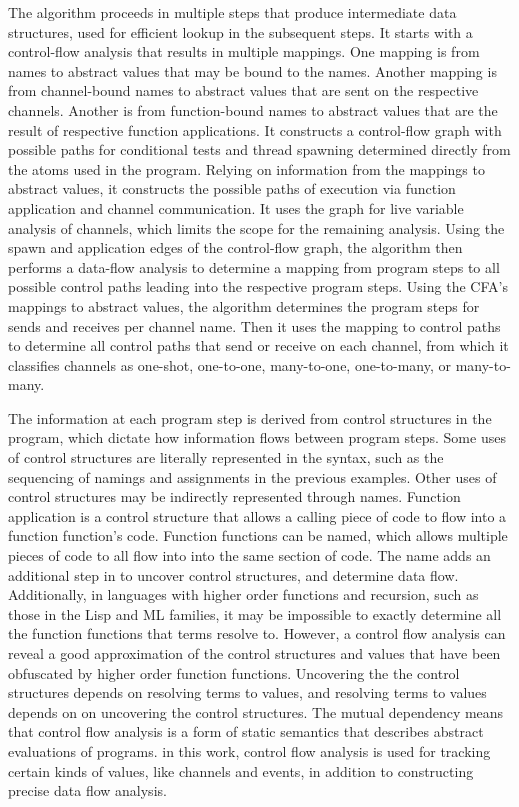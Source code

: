 \documentclass[10pt]{article}
\begin{document}
The algorithm proceeds in multiple steps that produce intermediate data structures, used for
efficient lookup in the subsequent steps.  It starts with a control-flow analysis that
results in multiple mappings. One mapping is from names to abstract values that may be bound to
the names. Another mapping is from channel-bound names to abstract values that are
sent on the respective channels. Another is from function-bound names to abstract values
that are the result of respective function applications.  It constructs a control-flow graph 
with possible paths for conditional tests and thread spawning determined directly from the
atoms used in the program.  Relying on information from the mappings to abstract values,
it constructs the possible paths of execution via function application and channel
communication.  It uses the graph for live variable analysis of channels, which limits the
scope for the remaining analysis.  Using the spawn and application edges of the control-flow
graph, the algorithm then performs a data-flow analysis to determine a mapping from program
steps to all possible control paths leading into the respective program steps.  Using the
CFA's mappings to abstract values, the algorithm determines the program steps for sends and
receives per channel name.  Then it uses the mapping to control paths to determine all
control paths that send or receive on each channel, from which it classifies channels as
one-shot, one-to-one, many-to-one, one-to-many, or many-to-many.

The information at each program step is derived from control structures in the program, which
dictate how information flows between program steps. Some uses of control structures are
literally represented in the syntax, such as the sequencing of namings and assignments in the
previous examples. Other uses of control structures may be indirectly represented through
names. Function application is a control structure that allows a calling piece of code to
flow into a function function's code.  Function functions can be named, which allows
multiple pieces of code to all flow into into the same section of code. The name adds an
additional step in to uncover control structures, and determine data flow.
Additionally, in languages with higher order functions and recursion, such as those in the Lisp
and ML families, it may be impossible to exactly determine all the function functions that
terms resolve to. However, a control flow analysis can reveal a good
approximation of the control structures and values that have been obfuscated by higher order
function functions.  Uncovering the the control structures depends on resolving terms
to values, and resolving terms to values depends on on uncovering the control
structures. The mutual dependency means that control flow analysis is a form of
static semantics that describes abstract evaluations of programs. in this work, control flow
analysis is used for tracking certain kinds of values, like channels and events, in addition to
constructing precise data flow analysis. 
\end{document}
